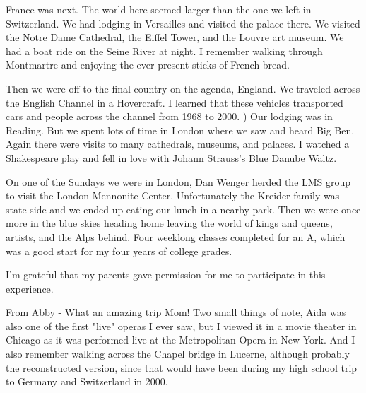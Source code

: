 France was next.
The world here seemed larger than the one we left in Switzerland.
We had lodging in Versailles and visited the palace there.
We visited the Notre Dame Cathedral, the Eiffel Tower, and the Louvre art museum.
We had a boat ride on the Seine River at night.
I remember walking through Montmartre and enjoying the ever present sticks of French bread.

Then we were off to the final country on the agenda, England.
We traveled across the English Channel in a Hovercraft.
I learned that these vehicles transported cars and people across the channel from 1968 to 2000.
) Our lodging was in Reading.
But we spent lots of time in London where we saw and heard Big Ben.
Again there were visits to many cathedrals, museums, and palaces.
I watched a Shakespeare play and fell in love with Johann Strauss's Blue Danube Waltz.

On one of the Sundays we were in London, Dan Wenger herded the LMS group to visit the London Mennonite Center.
Unfortunately the Kreider family was state side and we ended up eating our lunch in a nearby park.
Then we were once more in the blue skies heading home leaving the world of kings and queens, artists, and the Alps behind.
Four weeklong classes completed for an A, which was a good start for my four years of college grades.

I'm grateful that my parents gave permission for me to participate in this experience.

From Abby - What an amazing trip Mom! Two small things of note, Aida was also one of the first "live" operas I ever saw, but I viewed it in a movie theater in Chicago as it was performed live at the Metropolitan Opera in New York.
And I also remember walking across the Chapel bridge in Lucerne, although probably the reconstructed version, since that would have been during my high school trip to Germany and Switzerland in 2000.





